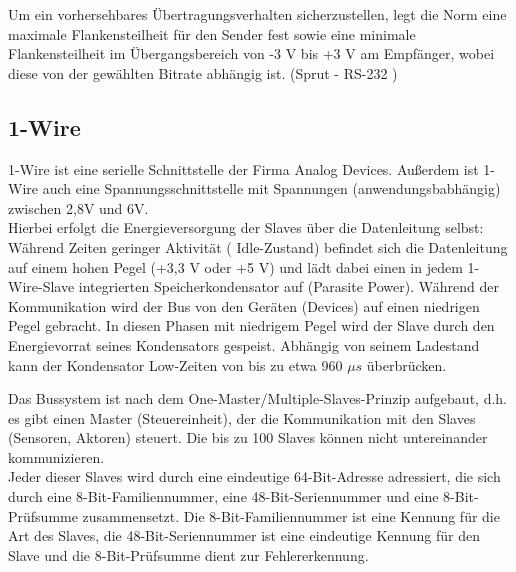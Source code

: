 Um ein vorhersehbares Übertragungsverhalten sicherzustellen, legt die Norm eine maximale Flankensteilheit
für den Sender fest sowie eine minimale Flankensteilheit im Übergangsbereich von -3 V bis +3 V am Empfänger,
wobei diese von der gewählten Bitrate abhängig ist.
(Sprut - RS-232 \cite{rs232})

\subsection{1-Wire}
\label{sec:one_wire}

1-Wire ist eine serielle Schnittstelle der Firma Analog Devices. Außerdem ist 1-Wire auch eine
Spannungsschnittstelle mit Spannungen (anwendungsbabhängig) zwischen 2,8V und 6V. \\
Hierbei erfolgt die Energieversorgung der Slaves über die Datenleitung selbst: Während Zeiten geringer Aktivität (
Idle-Zustand) befindet sich die Datenleitung auf einem hohen Pegel (+3,3 V oder +5 V) und lädt dabei einen
in jedem 1-Wire-Slave integrierten Speicherkondensator auf (Parasite Power). Während der Kommunikation wird der
Bus von den Geräten (Devices) auf einen niedrigen Pegel gebracht. In diesen Phasen mit niedrigem Pegel wird der
Slave durch den Energievorrat seines Kondensators gespeist. Abhängig von seinem Ladestand kann der Kondensator
Low-Zeiten von bis zu etwa 960 \(\mu s\) überbrücken.

Das Bussystem ist nach dem One-Master/Multiple-Slaves-Prinzip aufgebaut, d.h. es gibt einen Master (Steuereinheit),
der die Kommunikation mit den Slaves (Sensoren, Aktoren) steuert. Die bis zu 100 Slaves können nicht untereinander
kommunizieren.\\
Jeder dieser Slaves wird durch eine eindeutige 64-Bit-Adresse adressiert, die sich durch eine 8-Bit-Familiennummer,
eine 48-Bit-Seriennummer und eine 8-Bit-Prüfsumme zusammensetzt. Die 8-Bit-Familiennummer ist eine Kennung für
die Art des Slaves, die 48-Bit-Seriennummer ist eine eindeutige Kennung für den Slave und die 8-Bit-Prüfsumme
dient zur Fehlererkennung.

